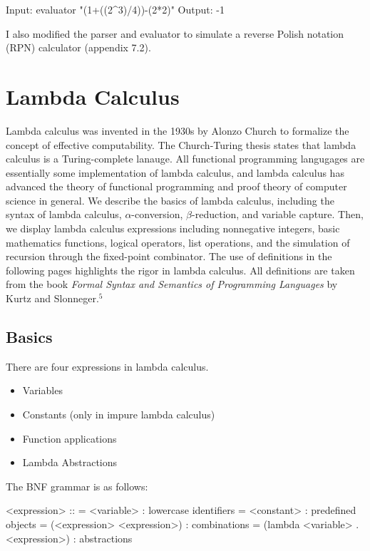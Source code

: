 \documentclass[11pt]{article}
\begin{document}
\hspace{2cm}\begin{verbbox}
Input:  evaluator "(1+((2^3)/4))-(2*2)" 
Output: -1
\end{verbbox}
\theverbbox

I also modified the parser and evaluator to simulate a reverse Polish notation (RPN) calculator (appendix 7.2). 
\section{Lambda Calculus}
Lambda calculus was invented in the 1930s by Alonzo Church to formalize the concept of effective computability. The Church-Turing thesis states that lambda calculus is a Turing-complete lanauge. All functional programming langugages are essentially some implementation of lambda calculus, and lambda calculus has advanced the theory of functional programming and proof theory of computer science in general. We describe the basics of lambda calculus, including the syntax of lambda calculus, $\alpha$-conversion, $\beta$-reduction, and variable capture. Then, we display lambda calculus expressions including nonnegative integers, basic mathematics functions, logical operators, list operations, and the simulation of recursion through the fixed-point combinator. The use of definitions in the following pages highlights the rigor in lambda calculus. All definitions are taken from the book \textit{Formal Syntax and Semantics of Programming Languages} by Kurtz and Slonneger.$^5$

\subsection{Basics}

There are four expressions in lambda calculus.

\begin{itemize}
\item Variables
\item Constants (only in impure lambda calculus)
\item Function applications
\item Lambda Abstractions
\end{itemize}

The BNF grammar is as follows:

\hspace{2cm}\begin{verbbox}
<expression> :: = <variable> : lowercase identifiers
                = <constant> : predefined objects
                = (<expression> <expression>) : combinations
                = (lambda <variable> . <expression>) : abstractions
\end{verbbox}
\theverbbox
\end{document}
